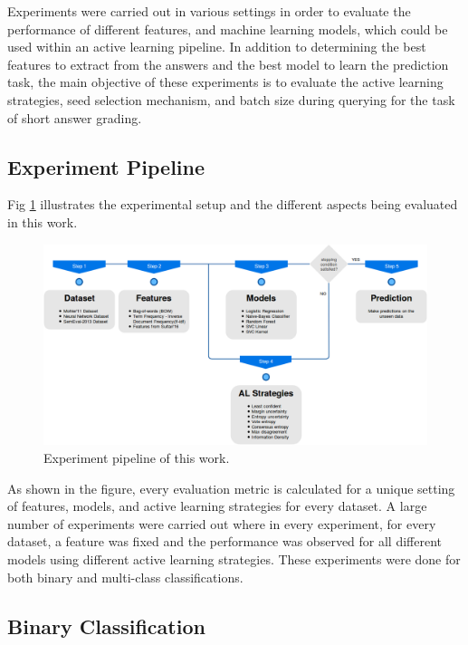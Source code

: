     Experiments were carried out in various settings in order to evaluate the performance of different features, and machine learning models, which could be used within an active learning pipeline. In addition to determining the best features to extract from the answers and the best model to learn the prediction task, the main objective of these experiments is to evaluate the active learning strategies, seed selection mechanism, and batch size during querying for the task of short answer grading.
    
    \subsection{Experiment Pipeline}
    
    Fig \ref{exp_pipeline} illustrates the experimental setup and the different aspects being evaluated in this work.
    
    \begin{figure}[h]
    	\centering
    	\includegraphics[scale=0.3]{images/experiment_pipeline}
    	\caption{Experiment pipeline of this work.}
    	\label{exp_pipeline}
    \end{figure}
    
    As shown in the figure, every evaluation metric is calculated for a unique setting of features, models, and active learning strategies for every dataset. A large number of experiments were carried out where in every experiment, for every dataset, a feature was fixed and the performance was observed for all different models using different active learning strategies. These experiments were done for both binary and multi-class classifications.  
    
    \subsection{Binary Classification}
    
